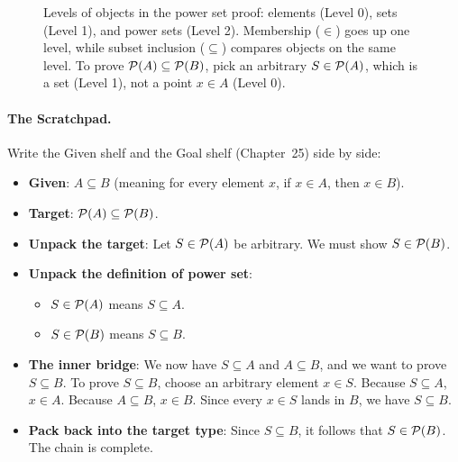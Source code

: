 \begin{figure}[htbp]
\caption{Levels of objects in the power set proof: elements (Level 0), sets (Level 1), and power sets (Level 2). Membership ($\in$) goes up one level, while subset inclusion ($\subseteq$) compares objects on the same level. To prove $\mathcal{P}(A) \subseteq \mathcal{P}(B)$, pick an arbitrary $S \in \mathcal{P}(A)$, which is a set (Level 1), not a point $x \in A$ (Level 0).}\label{guide:fig-type-hierarchy}
\end{figure}

\paragraph{The Scratchpad.}
Write the Given shelf and the Goal shelf (Chapter~25) side by side:
\begin{itemize}
  \item \textbf{Given}: $A \subseteq B$ (meaning for every element $x$, if $x \in A$, then $x \in B$).
  \item \textbf{Target}: $\mathcal{P}(A) \subseteq \mathcal{P}(B)$.
  \item \textbf{Unpack the target}: Let $S \in \mathcal{P}(A)$ be arbitrary. We must show $S \in \mathcal{P}(B)$.
  \item \textbf{Unpack the definition of power set}: 
  \begin{itemize}
    \item $S \in \mathcal{P}(A)$ means $S \subseteq A$.
    \item $S \in \mathcal{P}(B)$ means $S \subseteq B$.
  \end{itemize}
  \item \textbf{The inner bridge}: We now have $S \subseteq A$ and $A \subseteq B$, and we want to prove $S \subseteq B$. To prove $S \subseteq B$, choose an arbitrary element $x \in S$. Because $S \subseteq A$, $x \in A$. Because $A \subseteq B$, $x \in B$. Since every $x \in S$ lands in $B$, we have $S \subseteq B$.
  \item \textbf{Pack back into the target type}: Since $S \subseteq B$, it follows that $S \in \mathcal{P}(B)$. The chain is complete.
\end{itemize}

